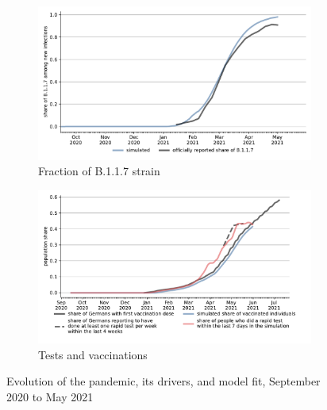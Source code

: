 \begin{figure}[!tp]
\begin{subfigure}[b]{0.475\textwidth}
        \includegraphics[width=\textwidth]{figures/results/figures/scenario_comparisons/combined_fit/full_share_b117}

        \caption{Fraction of B.1.1.7 strain}
        \label{fig:share_b117}
    \end{subfigure}
    \hfill
    \begin{subfigure}[b]{0.475\textwidth}
        \centering

        \includegraphics[width=\textwidth]{figures/results/figures/scenario_comparisons/combined_fit/full_share_rapid_test_in_last_week_and_vaccinated}

        \caption{{Tests and vaccinations}}
        \label{fig:antigen_tests_vaccinations}
    \end{subfigure}

    \caption{Evolution of the pandemic, its drivers, and model fit, September 2020 to May 2021}
    \label{fig:pandemic_drivers_model_fit}


\end{figure}
